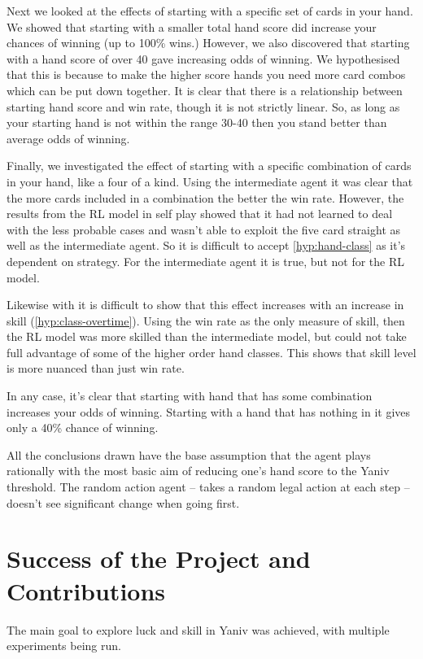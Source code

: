 \documentclass[../main.tex]{subfiles}
\begin{document}
Next we looked at the effects of starting with a specific set of cards in your hand. We showed that starting with a smaller total hand score did increase your chances of winning (up to 100\% wins.) However, we also discovered that starting with a hand score of over 40 gave increasing odds of winning. We hypothesised that this is because to make the higher score hands you need more card combos which can be put down together. It is clear that there is a relationship between starting hand score and win rate, though it is not strictly linear. So, as long as your starting hand is not within the range 30-40 then you stand better than average odds of winning. 

Finally, we investigated the effect of starting with a specific combination of cards in your hand, like a four of a kind. Using the intermediate agent it was clear that the more cards included in a combination the better the win rate. However, the results from the RL model in self play showed that it had not learned to deal with the less probable cases and wasn't able to exploit the five card straight as well as the intermediate agent. So it is difficult to accept \cref{hyp:hand-class} as it's dependent on strategy. For the intermediate agent it is true, but not for the RL model. 

Likewise with it is difficult to show that this effect increases with an increase in skill (\cref{hyp:class-overtime}). Using the win rate as the only measure of skill, then the RL model was more skilled than the intermediate model, but could not take full advantage of some of the higher order hand classes. This shows that skill level is more nuanced than just win rate. 

In any case, it's clear that starting with hand that has some combination increases your odds of winning. Starting with a hand that has nothing in it gives only a 40\% chance of winning.

All the conclusions drawn have the base assumption that the agent plays rationally with the most basic aim of reducing one's hand score to the Yaniv threshold. The random action agent -- takes a random legal action at each step -- doesn't see significant change when going first. 

\section{Success of the Project and Contributions}
The main goal to explore luck and skill in Yaniv was achieved, with multiple experiments being run. 
\end{document}

